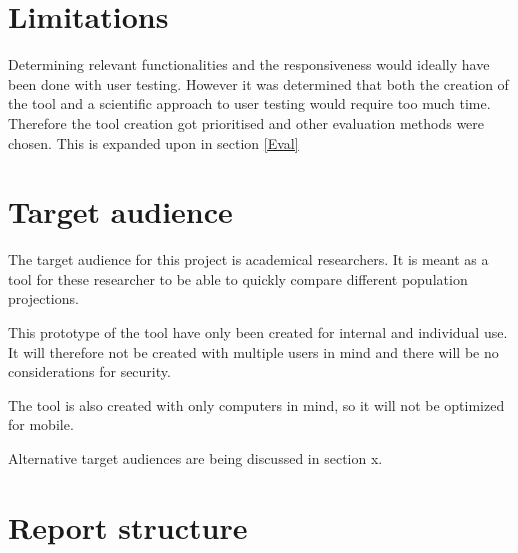 \section{Limitations}\label{Lim}

Determining relevant functionalities and the responsiveness would ideally have been done with user testing.  However it was determined that both the creation of the tool and a scientific approach to user testing would require too much time.
Therefore the tool creation got prioritised and other evaluation methods were chosen. This is expanded upon in section \ref{Eval}

\section{Target audience}\label{TA}

The target audience for this project is academical researchers. It is meant as a tool for these researcher to be able to quickly compare different population projections. 

This prototype of the tool have only been created for internal and individual use. It will therefore not be created with multiple users in mind and there will be no considerations for security.


The tool is also created with only computers in mind, so it will not be optimized for mobile. 

Alternative target audiences are being discussed in section x.

\section{Report structure}


%
%

